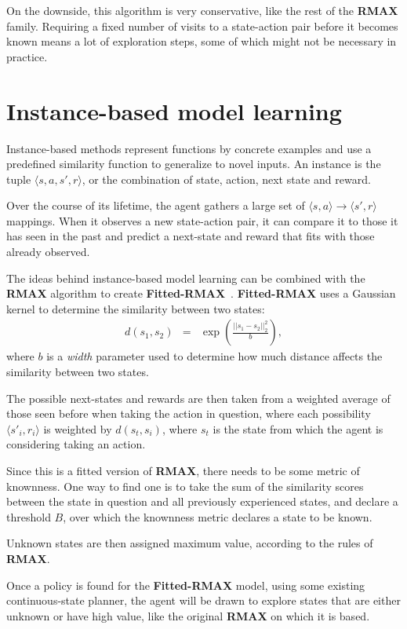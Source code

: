 On the downside, this algorithm is very conservative, like the rest of the {\bf RMAX} family. Requiring a fixed number of visits to a state-action pair before it becomes known means a lot of exploration steps, some of which might not be necessary in practice.



\section{Instance-based model learning}

Instance-based methods represent functions by concrete examples and use a predefined similarity function to generalize to novel inputs. An instance is the tuple $\langle s, a, s', r \rangle$, or the combination of state, action, next state and reward.

Over the course of its lifetime, the agent gathers a large set of $\langle s, a\rangle \rightarrow \langle s', r \rangle$ mappings. When it observes a new state-action pair, it can compare it to those it has seen in the past and predict a next-state and reward that fits with those already observed.

The ideas behind instance-based model learning can be combined with the {\bf RMAX} algorithm to create {\bf Fitted-RMAX}~\cite{jong07}. {\bf Fitted-RMAX} uses a Gaussian kernel to determine the similarity between two states:
\begin{eqnarray}
d(s_1,s_2)&=&\exp\left(\frac{||s_1 - s_2||^2_2}{b}\right),
\end{eqnarray}
where $b$ is a \emph{width} parameter used to determine how much distance affects the similarity between two states.

The possible next-states and rewards are then taken from a weighted average of those seen before when taking the action in question, where each possibility $\langle s'_i, r_i \rangle$ is weighted by $d(s_t, s_i)$, where $s_t$ is the state from which the agent is considering taking an action.

Since this is a fitted version of {\bf RMAX}, there needs to be some metric of knownness. One way to find one is to take the sum of the similarity scores between the state in question and all previously experienced states, and declare a threshold $B$, over which the knownness metric declares a state to be known.

Unknown states are then assigned maximum value, according to the rules of {\bf RMAX}.

Once a policy is found for the {\bf Fitted-RMAX} model, using some existing continuous-state planner, the agent will be drawn to explore states that are either unknown or have high value, like the original {\bf RMAX} on which it is based.




